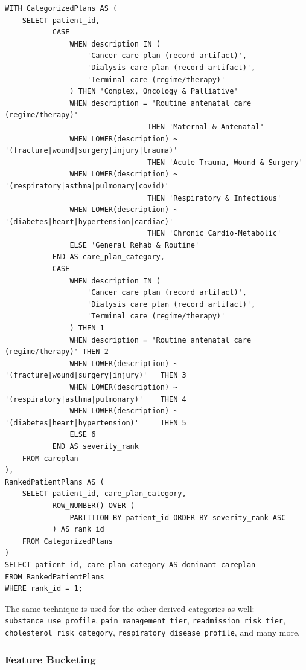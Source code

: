 \begin{lstlisting}[style=sqlstyle]
WITH CategorizedPlans AS (
    SELECT patient_id,
           CASE
               WHEN description IN (
                   'Cancer care plan (record artifact)',
                   'Dialysis care plan (record artifact)',
                   'Terminal care (regime/therapy)'
               ) THEN 'Complex, Oncology & Palliative'
               WHEN description = 'Routine antenatal care (regime/therapy)'
                                 THEN 'Maternal & Antenatal'
               WHEN LOWER(description) ~ '(fracture|wound|surgery|injury|trauma)'
                                 THEN 'Acute Trauma, Wound & Surgery'
               WHEN LOWER(description) ~ '(respiratory|asthma|pulmonary|covid)'
                                 THEN 'Respiratory & Infectious'
               WHEN LOWER(description) ~ '(diabetes|heart|hypertension|cardiac)'
                                 THEN 'Chronic Cardio-Metabolic'
               ELSE 'General Rehab & Routine'
           END AS care_plan_category,
           CASE
               WHEN description IN (
                   'Cancer care plan (record artifact)',
                   'Dialysis care plan (record artifact)',
                   'Terminal care (regime/therapy)'
               ) THEN 1
               WHEN description = 'Routine antenatal care (regime/therapy)' THEN 2
               WHEN LOWER(description) ~ '(fracture|wound|surgery|injury)'   THEN 3
               WHEN LOWER(description) ~ '(respiratory|asthma|pulmonary)'    THEN 4
               WHEN LOWER(description) ~ '(diabetes|heart|hypertension)'     THEN 5
               ELSE 6
           END AS severity_rank
    FROM careplan
),
RankedPatientPlans AS (
    SELECT patient_id, care_plan_category,
           ROW_NUMBER() OVER (
               PARTITION BY patient_id ORDER BY severity_rank ASC
           ) AS rank_id
    FROM CategorizedPlans
)
SELECT patient_id, care_plan_category AS dominant_careplan
FROM RankedPatientPlans
WHERE rank_id = 1;
\end{lstlisting}

The same technique is used for the other derived categories as well: \texttt{substance\_use\_profile}, \texttt{pain\_management\_tier}, \texttt{readmission\_risk\_tier}, \texttt{cholesterol\_risk\_category}, \texttt{respiratory\_disease\_profile}, and many more.

\subsubsection*{Feature Bucketing}

